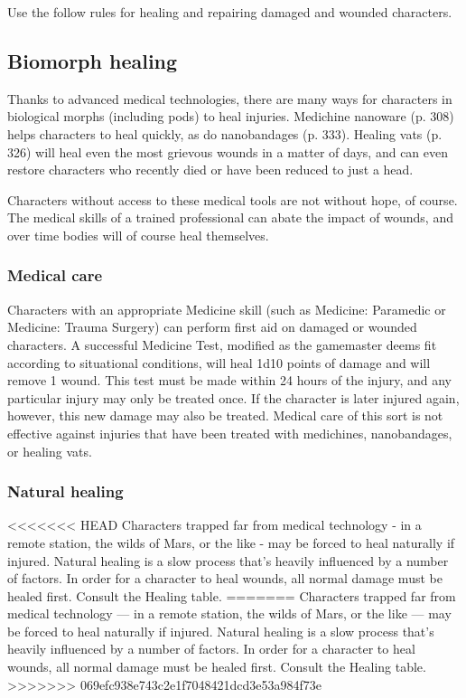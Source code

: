 Use the follow rules for healing and repairing damaged and wounded characters.

\subsection{Biomorph healing}

Thanks to advanced medical technologies, there are many ways for characters in biological morphs (including pods) to heal injuries. Medichine nanoware (p. 308) helps characters to heal quickly, as do nanobandages (p. 333). Healing vats (p. 326) will heal even the most grievous wounds in a matter of days, and can even restore characters who recently died or have been reduced to just a head.

Characters without access to these medical tools are not without hope, of course. The medical skills of a trained professional can abate the impact of wounds, and over time bodies will of course heal themselves.

\subsubsection{Medical care}

Characters with an appropriate Medicine skill (such as Medicine: Paramedic or Medicine: Trauma Surgery) can perform first aid on damaged or wounded characters. A successful Medicine Test, modified as the gamemaster deems fit according to situational conditions, will heal 1d10 points of damage and will remove 1 wound. This test must be made within 24 hours of the injury, and any particular injury may only be treated once. If the character is later injured again, however, this new damage may also be treated. Medical care of this sort is not effective against injuries that have been treated with medichines, nanobandages, or healing vats.

\subsubsection{Natural healing}

<<<<<<< HEAD
Characters trapped far from medical technology - in a remote station, the wilds of Mars, or the like - may be forced to heal naturally if injured. Natural healing is a slow process that’s heavily influenced by a number of factors. In order for a character to heal wounds, all normal damage must be healed first. Consult the Healing table.
=======
Characters trapped far from medical technology --- in a remote station, the wilds of Mars, or the like --- may be forced to heal naturally if injured. Natural healing is a slow process that’s heavily influenced by a number of factors. In order for a character to heal wounds, all normal damage must be healed first. Consult the Healing table.
>>>>>>> 069efc938e743c2e1f7048421dcd3e53a984f73e

